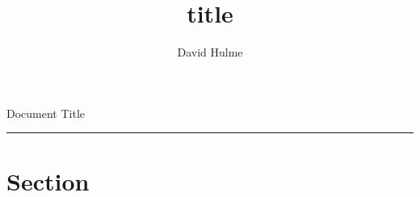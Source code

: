 \documentclass[a4paper]{article}
\title{title}
\author{David Hulme}
\begin{document}
\pagestyle{fancy}
\fancyhead{}
\fancyfoot{}
\fancyfoot[LO,LE]{\thepage}
\fancyfoot[RO, RE]{\today}


\begin{center}
\huge{Document Title}\\
[1cm]
\end{center}
\hrule

\section{Section}
\end{document}
